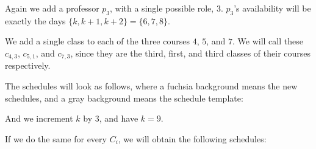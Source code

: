 Again we add a professor $p_3$, with a single possible role, $3$. $p_3$'s availability will be exactly the days $\{k, k + 1, k + 2\} = \{6, 7, 8\}$. 

We add a single class to each of the three courses $4$, $5$, and $7$. We will call these $c_{4, 3}$, $c_{5, 1}$, and $c_{7, 3}$, since they are the third, first, and third classes of their courses respectively.

The schedules will look as follows, where a {\color{Fuchsia}fuchsia} background means the new schedules, and a {\color{gray}gray} background means the schedule template:


\begin{center}
\end{center}

And we increment $k$ by $3$, and have $k = 9$.

If we do the same for every $C_i$, we will obtain the following schedules:

